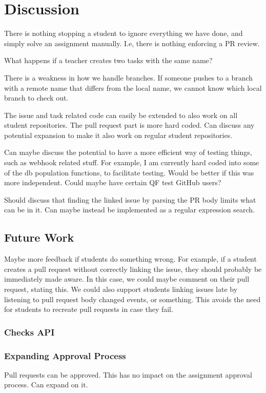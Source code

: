 
\chapter{Discussion}
\label{ch:discussion}

There is nothing stopping a student to ignore everything we have done, and simply solve an assignment manually.
I.e, there is nothing enforcing a PR review.

What happens if a teacher creates two tasks with the same name?

There is a weakness in how we handle branches.
If someone pushes to a branch with a remote name that differs from the local name, we cannot know which local branch to check out.

The issue and task related code can easily be extended to also work on all student repositories.
The pull request part is more hard coded.
Can discuss any potential expansion to make it also work on regular student repositories.

Can maybe discuss the potential to have a more efficient way of testing things, such as webhook related stuff.
For example, I am currently hard coded into some of the db population functions, to facilitate testing.
Would be better if this was more independent. 
Could maybe have certain QF test GitHub users?

Should discuss that finding the linked issue by parsing the PR body limits what can be in it.
Can maybe instead be implemented as a regular expression search.

\section{Future Work}

Maybe more feedback if students do something wrong.
For example, if a student creates a pull request without correctly linking the issue, they should probably be immediately made aware.
In this case, we could maybe comment on their pull request, stating this.
We could also support students linking issues late by listening to pull request body changed events, or something.
This avoids the need for students to recreate pull requests in case they fail.

\subsection{Checks API}

\subsection{Expanding Approval Process}
Pull requests can be approved. This has no impact on the assignment approval process. Can expand on it.

